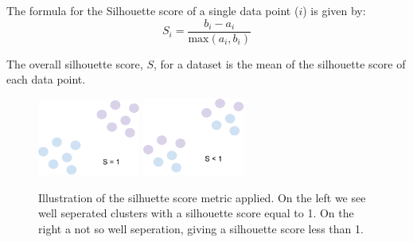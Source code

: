 The formula for the Silhouette score of a single data point ($i$) is given by:
\begin{equation}
    S_i = \frac{b_i-a_i}{\text{max}(a_i, b_i)}
\end{equation}

The overall silhouette score, $S$, for a dataset is the mean of the silhouette score of each data point.
\begin{figure}[H]
    \centering
    \includegraphics[width=0.3\textwidth]{figures/figure-pdf/Shigh.pdf}
    \hspace{1cm}
    \includegraphics[width=0.3\textwidth]{figures/figure-pdf/Slow.pdf}
    \caption{Illustration of the silhuette score metric applied. On the left we see well seperated clusters with a silhouette score equal to 1. On the right a not so well seperation, giving a silhouette score less than 1.}
    \label{fig:knn}
\end{figure}

